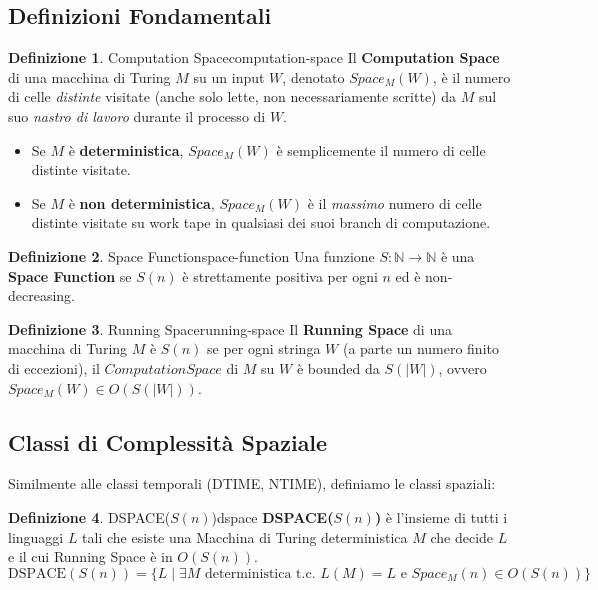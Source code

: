\documentclass[a4paper]{article}
\theoremstyle{definition} %
\newtheorem{definition}{Definizione}[section]
\begin{document}
\subsection{Definizioni Fondamentali}

\begin{definition}{Computation Space}{computation-space}
Il \textbf{Computation Space} di una macchina di Turing $M$ su un input $W$, denotato $Space_M(W)$, è il numero di celle \emph{distinte} visitate (anche solo lette, non necessariamente scritte) da $M$ sul suo \emph{nastro di lavoro} durante il processo di $W$.
\begin{itemize}
    \item Se $M$ è \textbf{deterministica}, $Space_M(W)$ è semplicemente il numero di celle distinte visitate.
    \item Se $M$ è \textbf{non deterministica}, $Space_M(W)$ è il \emph{massimo} numero di celle distinte visitate su work tape in qualsiasi dei suoi branch di computazione.
\end{itemize}
\end{definition}

\begin{definition}{Space Function}{space-function}
Una funzione $S: \mathbb{N} \to \mathbb{N}$ è una \textbf{Space Function} se $S(n)$ è strettamente positiva per ogni $n$ ed è non-decreasing.
\end{definition}

\begin{definition}{Running Space}{running-space}
Il \textbf{Running Space} di una macchina di Turing $M$ è $S(n)$ se per ogni stringa $W$ (a parte un numero finito di eccezioni), il $Computation Space$ di $M$ su $W$ è bounded da $S(|W|)$, ovvero $Space_M(W) \in O(S(|W|))$.
\end{definition}

\subsection{Classi di Complessità Spaziale}

Similmente alle classi temporali (DTIME, NTIME), definiamo le classi spaziali:

\begin{definition}{DSPACE($S(n)$)}{dspace}
\textbf{DSPACE($S(n)$)} è l'insieme di tutti i linguaggi $L$ tali che esiste una Macchina di Turing deterministica $M$ che decide $L$ e il cui Running Space è in $O(S(n))$.
\[ \text{DSPACE}(S(n)) = \{ L \mid \exists M \text{ deterministica t.c. } L(M) = L \text{ e } Space_M(n) \in O(S(n)) \} \]
\end{definition}
\end{document}
